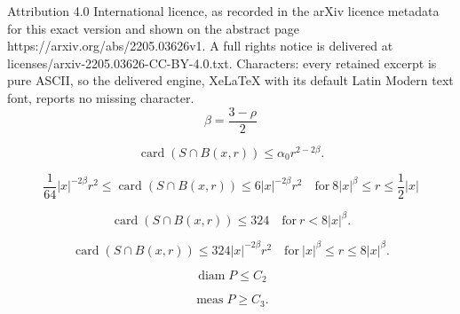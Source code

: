 \documentclass[10pt,a4paper]{amsart}
\def\card{\operatorname{card}}
\def\meas{\operatorname{meas}}
\newcommand{\diam}{\operatorname{diam}}
\begin{document}
Attribution 4.0 International licence, as recorded in the arXiv licence metadata for this exact version and shown on the abstract page https://arxiv.org/abs/2205.03626v1. A full rights notice is delivered at licenses/arxiv-2205.03626-CC-BY-4.0.txt. Characters: every retained excerpt is pure ASCII, so the delivered engine, XeLaTeX with its default Latin Modern text font, reports no missing character.
\begin{equation}\label{def-beta}
\beta=\frac{3-\rho}{2}
\end{equation}

\begin{equation}\label{7a0}
\card(S\cap B(x,r)) \leq \alpha_0 r^{2-2\beta}.
\end{equation}

\begin{equation}\label{7a}
\frac{1}{64} |x|^{-2\beta}r^2
\leq \card(S\cap B(x,r))
\leq 6 |x|^{-2\beta}r^2
\quad\text{for}\ 8|x|^\beta\leq r\leq \frac12 |x|
\end{equation}

\begin{equation}\label{7b}
\card(S\cap B(x,r))\leq 324
\quad\text{for}\ r<8|x|^\beta.
\end{equation}

\begin{equation}\label{7a1}
\card(S\cap B(x,r))
\leq 324 |x|^{-2\beta}r^2
\quad\text{for}\ |x|^\beta\leq r\leq 8|x|^\beta  .
\end{equation}

\begin{equation}\label{5a}
\diam P\leq C_2
\end{equation}

\begin{equation}\label{5a1}
\meas P\geq C_3.
\end{equation}
\end{document}
